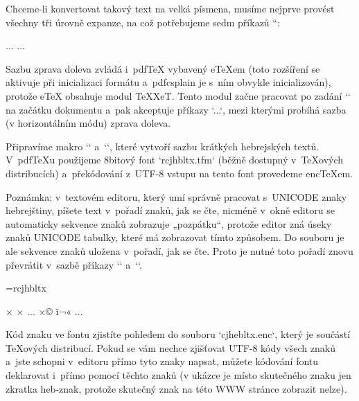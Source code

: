 Chceme-li konvertovat takový text na velká písmena, musíme nejprve provést všechny tři úrovně expanze, na což potřebujeme sedm příkazů `\expandafter`: 

\begtt
\def\exseven{\expandafter\expandafter\expandafter 
             \expandafter\expandafter\expandafter\expandafter} 
...\uppercase\exseven{\mtext{id}}... 
\endtt

 


Sazbu zprava doleva zvládá i~pdfTeX vybavený eTeXem (toto rozšíření se aktivuje při inicializaci formátu a~pdfcsplain je s~ním obvykle inicializován), protože eTeX obsahuje modul TeXXeT. Tento modul začne pracovat po zadání `` na začátku dokumentu a~pak akceptuje příkazy `\beginR...\endR`, mezi kterými probíhá sazba (v horizontálním módu) zprava doleva. 



Připravíme makro `` a~``, které vytvoří sazbu krátkých hebrejských textů. V~pdfTeXu použijeme 8bitový font `rcjhbltx.tfm` (běžně dostupný v~TeXových distribucích) a~překódování z~UTF-8 vstupu na tento font provedeme encTeXem. 



Poznámka: v~textovém editoru, který umí správně pracovat s~UNICODE znaky hebrejštiny, píšete text v~pořadí znaků, jak se čte, nicméně v~okně editoru se automaticky sekvence znaků zobrazuje „pozpátku“, protože editor zná úseky znaků UNICODE tabulky, které má zobrazovat tímto způsobem. Do souboru je ale sekvence znaků uložena v~pořadí, jak se čte. Proto je nutné toto pořadí znovu převrátit v~sazbě příkazy `\beginR` a~`\endR`. 

\begtt
{} 
\font\hebrewfont=rcjhbltx 
\def\texthebrew#1{\leavevmode\beginR{\hebrewfont#1}\endR} 
\long\def\hebrewpar#1{\par\hbox{\beginR\vbox{\hebrewfont#1}\endR}} 
 
\mubyte\HEBalef             ^^d7^^90\endmubyte      \chardef{} 
\mubyte\HEBbet              ^^d7^^91\endmubyte      \cahrdef{} 
... 
\mubyte\HEBshin             ^^d7^^a9\endmubyte      \chardef{} 
\mubyte\HEBshinshindotdages ^^ef^^ac^^ab\endmubyte  \chardef{} 
... 
\endtt


Kód znaku ve fontu zjistíte pohledem do souboru `cjhebltx.enc`, který je součástí TeXových distribucí. Pokud se vám nechce zjišťovat UTF-8 kódy všech znaků a~jste schopni v~editoru přímo tyto znaky napsat, můžete kódování fontu deklarovat i~přímo pomocí těchto znaků (v ukázce je místo skutečného znaku jen zkratka heb-znak, protože skutečný znak na této WWW stránce zobrazit nelze). 

